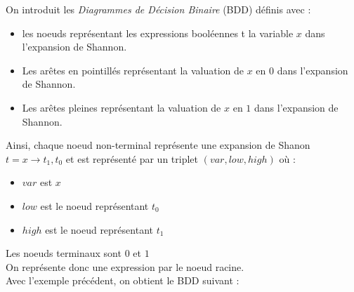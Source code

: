 \documentclass[a4paper, oneside]{report}
\begin{document}
On introduit les \textit{Diagrammes de Décision Binaire} (BDD) définis avec :
\begin{itemize}
\item les noeuds représentant les expressions booléennes t la variable $x$ dans l'expansion de Shannon.
\item Les arêtes en pointillés représentant la valuation de $x$ en $0$ dans l'expansion de Shannon.
\item Les arêtes pleines représentant la valuation de $x$ en $1$ dans l'expansion de Shannon.
\end{itemize}

Ainsi, chaque noeud non-terminal représente une expansion de Shanon $ t = x \rightarrow t_1, t_0 $ et est représenté par un triplet $(var, low, high)$ où :
\begin{itemize}
\item $var$ est $x$
\item $low$ est le noeud représentant $t_0$
\item $high$ est le noeud représentant $t_1$
\end{itemize}

Les noeuds terminaux sont $0$ et $1$\\

On représente donc une expression par le noeud racine.\\

Avec l'exemple précédent, on obtient le BDD suivant :

\newcommand{\largeur}{0.5\linewidth}
\end{document}
